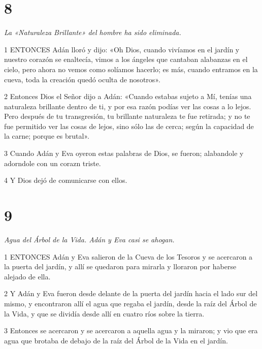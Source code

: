 \chapter{8}

\par \textit{La «Naturaleza Brillante» del hombre ha sido eliminada.}

\par 1 ENTONCES Adán lloró y dijo: «Oh Dios, cuando vivíamos en el jardín y nuestro corazón se enaltecía, vimos a los ángeles que cantaban alabanzas en el cielo, pero ahora no vemos como solíamos hacerlo; es más, cuando entramos en la cueva, toda la creación quedó oculta de nosotros».

\par 2 Entonces Dios el Señor dijo a Adán: «Cuando estabas sujeto a Mí, tenías una naturaleza brillante dentro de ti, y por esa razón podías ver las cosas a lo lejos. Pero después de tu transgresión, tu brillante naturaleza te fue retirada; y no te fue permitido ver las cosas de lejos, sino sólo las de cerca; según la capacidad de la carne; porque es brutal».

\par 3 Cuando Adán y Eva oyeron estas palabras de Dios, se fueron; alabandole y adorndole con un corazn triste.

\par 4 Y Dios dejó de comunicarse con ellos.

\chapter{9}

\par \textit{Agua del Árbol de la Vida. Adán y Eva casi se ahogan.}

\par 1 ENTONCES Adán y Eva salieron de la Cueva de los Tesoros y se acercaron a la puerta del jardín, y allí se quedaron para mirarla y lloraron por haberse alejado de ella.

\par 2 Y Adán y Eva fueron desde delante de la puerta del jardín hacia el lado sur del mismo, y encontraron allí el agua que regaba el jardín, desde la raíz del Árbol de la Vida, y que se dividía desde allí en cuatro ríos sobre la tierra.

\par 3 Entonces se acercaron y se acercaron a aquella agua y la miraron; y vio que era agua que brotaba de debajo de la raíz del Árbol de la Vida en el jardín.

